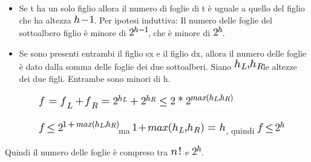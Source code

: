 \documentclass{article}
\providecommand{\tightlist}{%
  \setlength{\itemsep}{0pt}\setlength{\parskip}{0pt}}
\begin{document}
\begin{itemize}
\tightlist
\item
  {Se t ha un solo figlio allora il numero di foglie di t è uguale a
  quello del figlio che ha altezza
  }\includegraphics{images/image166.png}{. }{Per ipotesi induttiva}{: Il
  numero delle foglie del sottoalbero figlio è minore di
  }\includegraphics{images/image167.png}{, che è minore di
  }\includegraphics{images/image161.png}{.}
\item
  {Se sono presenti entrambi il figlio sx e il figlio dx, allora il
  numero delle foglie è dato dalla somma delle foglie dei due
  sottoalberi. Siano }\includegraphics{images/image168.png}{le altezze
  dei due figli. Entrambe sono minori di h.}
\end{itemize}

{~~~~~~~~}\includegraphics{images/image169.png}

{~~~~~~~~}\includegraphics{images/image170.png}{ma
}\includegraphics{images/image171.png}{, quindi
}\includegraphics{images/image172.png}

{Quindi il numero delle foglie è compreso tra
}\includegraphics{images/image160.png}{~e
}\includegraphics{images/image161.png}{.}

{}

{}
\end{document}
